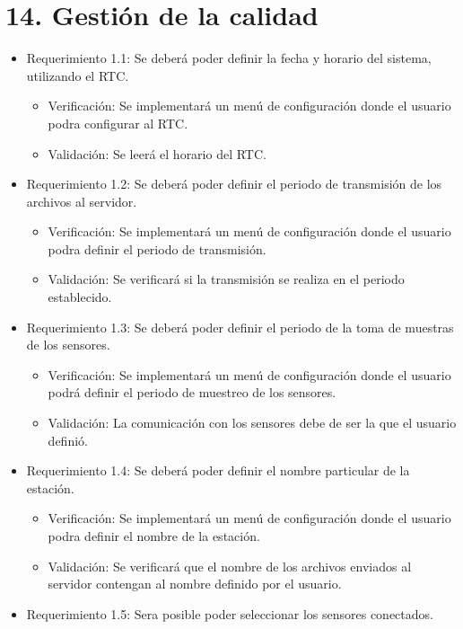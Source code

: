 \documentclass[
11pt, %
]{charter}
\begin{document}
\section{14. Gestión de la calidad}
\label{sec:calidad}
\begin{itemize}
\item Requerimiento 1.1: Se deberá poder definir la fecha y horario del sistema, utilizando el RTC.
	\begin{itemize}
		\item Verificación: Se implementará un menú de configuración donde el usuario podra configurar al RTC.
		\item Validación: Se leerá el horario del RTC.
	\end{itemize}
\item Requerimiento 1.2: Se deberá poder definir el periodo de transmisión de los archivos al servidor.
	\begin{itemize}
		\item Verificación: Se implementará un menú de configuración donde el usuario podra definir el periodo de transmisión.
		\item Validación: Se verificará si la transmisión se realiza en el periodo establecido.
	\end{itemize}
\item Requerimiento 1.3: Se deberá poder definir el periodo de la toma de muestras de los sensores.
	\begin{itemize}
		\item Verificación: Se implementará un menú de configuración donde el usuario podrá definir el periodo de muestreo de los sensores.
		\item Validación: La comunicación con los sensores debe de ser la que el usuario definió.
	\end{itemize}
\item Requerimiento 1.4: Se deberá poder definir el nombre particular de la estación.
	\begin{itemize}
		\item Verificación: Se implementará un menú de configuración donde el usuario podra definir el nombre de la estación.
		\item Validación: Se verificará que el nombre de los archivos enviados al servidor contengan al nombre definido por el usuario.
	\end{itemize}
\item Requerimiento 1.5: Sera posible poder seleccionar los sensores conectados.
	\begin{itemize}

\end{itemize}
\end{itemize}
\end{document}
